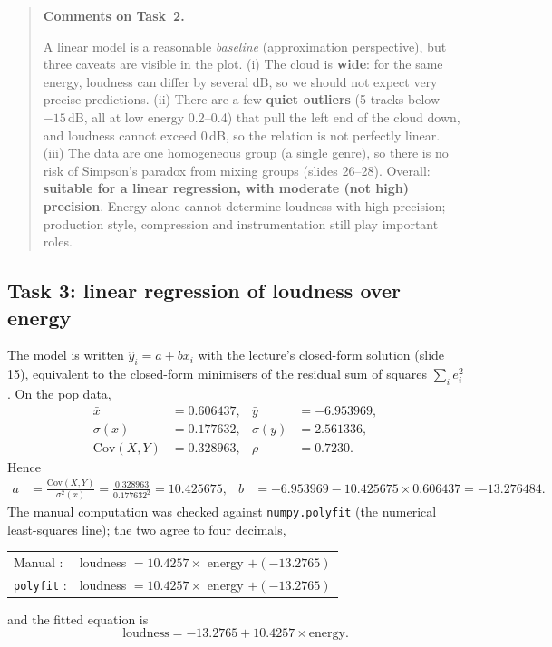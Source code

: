 \documentclass[11pt,letterpaper]{article}
\newenvironment{taskcomments}[1][Comments]{%
  \par\medskip\noindent
  \begin{quote}\small\textbf{#1.}\enspace\ignorespaces
}{%
  \end{quote}\medskip
}
\begin{document}
\begin{taskcomments}[Comments on Task~2]
A linear model is a reasonable \emph{baseline} (approximation perspective),
but three caveats are visible in the plot. (i) The cloud is \textbf{wide}:
for the same energy, loudness can differ by several dB, so we should not
expect very precise predictions. (ii) There are a few \textbf{quiet outliers}
(5 tracks below $-15$\,dB, all at low energy 0.2--0.4) that pull the left end
of the cloud down, and loudness cannot exceed 0\,dB, so the relation is not
perfectly linear. (iii) The data are one homogeneous group (a single genre),
so there is no risk of Simpson's paradox from mixing groups (slides 26--28).
Overall: \textbf{suitable for a linear regression, with moderate (not high)
precision}. Energy alone cannot determine loudness with high precision;
production style, compression and instrumentation still play important roles.
\end{taskcomments}

\subsection{Task 3: linear regression of loudness over energy}\label{sec:a1t3}

The model is written $\hat{y}_i = a + b x_i$ with the lecture's closed-form
solution (slide 15), equivalent to the closed-form minimisers of the residual
sum of squares $\sum_i e_i^2$. On the pop data,
\begin{align*}
  \bar{x} &= 0.606437, & \bar{y} &= -6.953969, \\
  \sigma(x) &= 0.177632, & \sigma(y) &= 2.561336, \\
  \mathrm{Cov}(X,Y) &= 0.328963, & \rho &= 0.7230.
\end{align*}
Hence
\begin{align*}
  a &= \frac{\mathrm{Cov}(X,Y)}{\sigma^2(x)}
     = \frac{0.328963}{0.177632^2} = 10.425675, &
  b &= -6.953969 - 10.425675 \times 0.606437 = -13.276484.
\end{align*}
The manual computation was checked against \texttt{numpy.polyfit} (the
numerical least-squares line); the two agree to four decimals,
\begin{center}
\small
\begin{tabular}{ll}
\toprule
Manual : & loudness $= 10.4257 \times$ energy $+ (-13.2765)$ \\
\texttt{polyfit} : & loudness $= 10.4257 \times$ energy $+ (-13.2765)$ \\
\bottomrule
\end{tabular}
\end{center}
and the fitted equation is
\begin{equation}
  \boxed{\;\mathrm{loudness} = -13.2765 + 10.4257 \times \mathrm{energy}.\;}
\end{equation}
\end{document}
